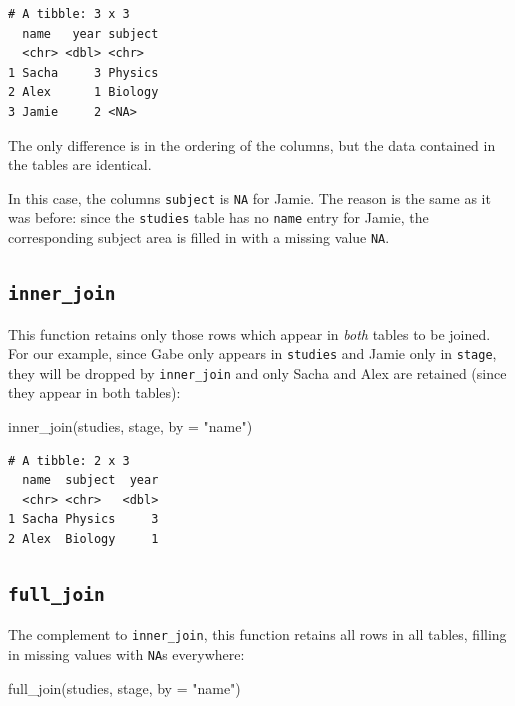 \documentclass[
  letterpaper,
  DIV=11,
  numbers=noendperiod]{scrreprt}
\newenvironment{Shaded}{\begin{snugshade}}{\end{snugshade}}
\newcommand{\AttributeTok}[1]{\textcolor[rgb]{0.40,0.45,0.13}{#1}}
\newcommand{\FunctionTok}[1]{\textcolor[rgb]{0.28,0.35,0.67}{#1}}
\newcommand{\NormalTok}[1]{\textcolor[rgb]{0.00,0.23,0.31}{#1}}
\newcommand{\StringTok}[1]{\textcolor[rgb]{0.13,0.47,0.30}{#1}}
\begin{document}
\begin{verbatim}
# A tibble: 3 x 3
  name   year subject
  <chr> <dbl> <chr>  
1 Sacha     3 Physics
2 Alex      1 Biology
3 Jamie     2 <NA>   
\end{verbatim}

The only difference is in the ordering of the columns, but the data
contained in the tables are identical.

In this case, the columns \texttt{subject} is \texttt{NA} for Jamie. The
reason is the same as it was before: since the \texttt{studies} table
has no \texttt{name} entry for Jamie, the corresponding subject area is
filled in with a missing value \texttt{NA}.

\hypertarget{inner_join}{%
\subsection{\texorpdfstring{\texttt{inner\_join}}{inner\_join}}\label{inner_join}}

This function retains only those rows which appear in \emph{both} tables
to be joined. For our example, since Gabe only appears in
\texttt{studies} and Jamie only in \texttt{stage}, they will be dropped
by \texttt{inner\_join} and only Sacha and Alex are retained (since they
appear in both tables):

\begin{Shaded}
\begin{Highlighting}[]
\FunctionTok{inner\_join}\NormalTok{(studies, stage, }\AttributeTok{by =} \StringTok{"name"}\NormalTok{)}
\end{Highlighting}
\end{Shaded}

\begin{verbatim}
# A tibble: 2 x 3
  name  subject  year
  <chr> <chr>   <dbl>
1 Sacha Physics     3
2 Alex  Biology     1
\end{verbatim}

\hypertarget{full_join}{%
\subsection{\texorpdfstring{\texttt{full\_join}}{full\_join}}\label{full_join}}

The complement to \texttt{inner\_join}, this function retains all rows
in all tables, filling in missing values with \texttt{NA}s everywhere:

\begin{Shaded}
\begin{Highlighting}[]
\FunctionTok{full\_join}\NormalTok{(studies, stage, }\AttributeTok{by =} \StringTok{"name"}\NormalTok{)}
\end{Highlighting}
\end{Shaded}
\end{document}
